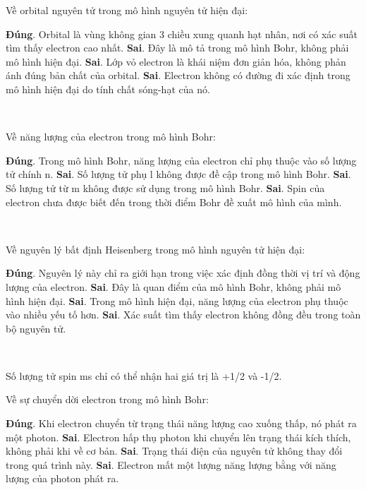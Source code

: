 \begin{loigiaiex}{1}
  Về orbital nguyên tử trong mô hình nguyên tử hiện đại: \begin {itemchoice} \itemch \textbf {Đúng}. Orbital là vùng không gian 3 chiều xung quanh hạt nhân, nơi có xác suất tìm thấy electron cao nhất. \itemch \textbf {Sai}. Đây là mô tả trong mô hình Bohr, không phải mô hình hiện đại. \itemch \textbf {Sai}. Lớp vỏ electron là khái niệm đơn giản hóa, không phản ánh đúng bản chất của orbital. \itemch \textbf {Sai}. Electron không có đường đi xác định trong mô hình hiện đại do tính chất sóng-hạt của nó. \end {itemchoice}  \phantom {a}\hfill { \faKey ~}
\end{loigiaiex}
\begin{loigiaiex}{2}
  Về năng lượng của electron trong mô hình Bohr: \begin {itemchoice} \itemch \textbf {Đúng}. Trong mô hình Bohr, năng lượng của electron chỉ phụ thuộc vào số lượng tử chính n. \itemch \textbf {Sai}. Số lượng tử phụ l không được đề cập trong mô hình Bohr. \itemch \textbf {Sai}. Số lượng tử từ m không được sử dụng trong mô hình Bohr. \itemch \textbf {Sai}. Spin của electron chưa được biết đến trong thời điểm Bohr đề xuất mô hình của mình. \end {itemchoice}  \phantom {a}\hfill { \faKey ~}
\end{loigiaiex}
\begin{loigiaiex}{3}
  Về nguyên lý bất định Heisenberg trong mô hình nguyên tử hiện đại: \begin {itemchoice} \itemch \textbf {Đúng}. Nguyên lý này chỉ ra giới hạn trong việc xác định đồng thời vị trí và động lượng của electron. \itemch \textbf {Sai}. Đây là quan điểm của mô hình Bohr, không phải mô hình hiện đại. \itemch \textbf {Sai}. Trong mô hình hiện đại, năng lượng của electron phụ thuộc vào nhiều yếu tố hơn. \itemch \textbf {Sai}. Xác suất tìm thấy electron không đồng đều trong toàn bộ nguyên tử. \end {itemchoice}  \phantom {a}\hfill { \faKey ~}
\end{loigiaiex}
\begin{loigiaiex}{4}
 Số lượng tử spin ms chỉ có thể nhận hai giá trị là +1/2 và -1/2. \phantom {a}\hfill { \faKey ~}
\end{loigiaiex}
\begin{loigiaiex}{5}
  Về sự chuyển dời electron trong mô hình Bohr: \begin {itemchoice} \itemch \textbf {Đúng}. Khi electron chuyển từ trạng thái năng lượng cao xuống thấp, nó phát ra một photon. \itemch \textbf {Sai}. Electron hấp thụ photon khi chuyển lên trạng thái kích thích, không phải khi về cơ bản. \itemch \textbf {Sai}. Trạng thái điện của nguyên tử không thay đổi trong quá trình này. \itemch \textbf {Sai}. Electron mất một lượng năng lượng bằng với năng lượng của photon phát ra. \end {itemchoice}  \phantom {a}\hfill { \faKey ~}
\end{loigiaiex}

